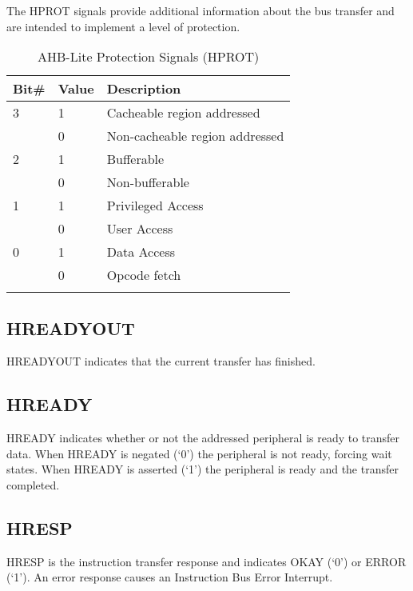The HPROT signals provide additional information about the bus transfer
and are intended to implement a level of protection.

\begin{longtable}[]{@{}lll@{}}
	\toprule
	Bit\# & Value & Description\tabularnewline
	\midrule
	\endhead
	3 & 1 & Cacheable region addressed\tabularnewline
	& 0 & Non-cacheable region addressed\tabularnewline
	2 & 1 & Bufferable\tabularnewline
	& 0 & Non-bufferable\tabularnewline
	1 & 1 & Privileged Access\tabularnewline
	& 0 & User Access\tabularnewline
	0 & 1 & Data Access\tabularnewline
	& 0 & Opcode fetch\tabularnewline
	\bottomrule
	\caption{AHB-Lite Protection Signals (HPROT)}
\end{longtable}

 \subsection{HREADYOUT}\label{hreadyout}

HREADYOUT indicates that the current transfer has finished.

 \subsection{HREADY}\label{hready}

HREADY indicates whether or not the addressed peripheral is ready to
transfer data. When HREADY is negated (`0') the peripheral is not ready,
forcing wait states. When HREADY is asserted (`1') the peripheral is
ready and the transfer completed.

 \subsection{HRESP}\label{hresp}

HRESP is the instruction transfer response and indicates OKAY (`0') or
ERROR (`1'). An error response causes an Instruction Bus Error
Interrupt.